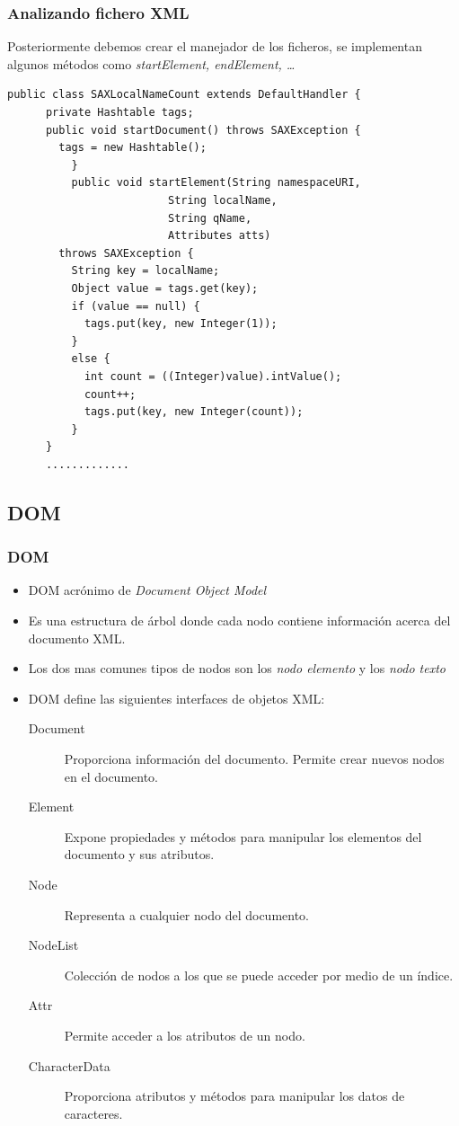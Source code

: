 \documentclass{beamer}
\begin{document}
\begin{frame}[fragile]
\frametitle{Analizando fichero XML}
Posteriormente debemos crear el manejador de los ficheros, se implementan algunos métodos como \emph{startElement, endElement, \dots}
\begin{scriptsize}

\begin{verbatim}
public class SAXLocalNameCount extends DefaultHandler {
      private Hashtable tags;
      public void startDocument() throws SAXException {
        tags = new Hashtable();
    	  }
    	  public void startElement(String namespaceURI,
                         String localName,
                         String qName, 
                         Attributes atts)
        throws SAXException {
          String key = localName;
          Object value = tags.get(key);
          if (value == null) {
            tags.put(key, new Integer(1));
          } 
          else {
            int count = ((Integer)value).intValue();
            count++;
            tags.put(key, new Integer(count));
          }
      }
      .............
\end{verbatim}

\end{scriptsize}
\end{frame}

\subsection{DOM}
\begin{frame}
\frametitle{DOM}
\begin{itemize}[<+->]
\item \alert{DOM} acrónimo de \emph{Document Object Model}
\item Es una estructura de árbol donde cada nodo contiene información acerca del documento XML.
\item Los dos mas comunes tipos de nodos son los \emph{nodo elemento} y los \emph{nodo texto}
\item DOM define las siguientes interfaces de objetos XML:
\begin{description}
\item[Document] Proporciona información del documento. Permite crear nuevos nodos en el documento.
\item[Element] Expone propiedades y métodos para manipular los elementos del documento y sus atributos.
\item[Node] Representa a cualquier nodo del documento.
\item[NodeList] Colección de nodos a los que se puede acceder por medio de un índice.
\item[Attr] Permite acceder a los atributos de un nodo.
\item[CharacterData] Proporciona atributos y métodos para manipular los datos de caracteres.
\end{description} 
\end{itemize}
\end{frame}
\end{document}
